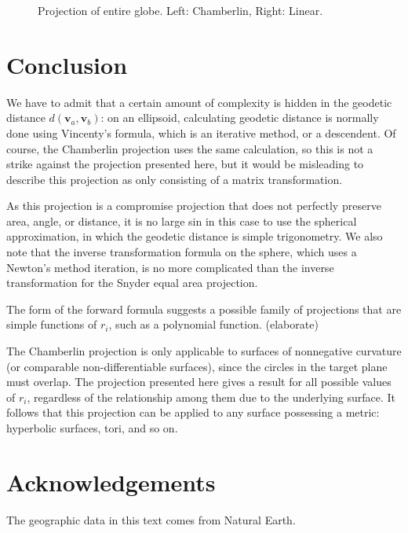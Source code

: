 \documentclass{amsart}[12pt]
\begin{document}
\begin{figure}%

\caption{Projection of entire globe. Left: Chamberlin, Right: Linear. }
\label{fig:globeproj}
\end{figure}

\section{Conclusion}
We have to admit that a certain amount of complexity is hidden in the geodetic
distance $d(\mathbf v_a, \mathbf v_b)$: on an ellipsoid, calculating geodetic
distance is normally done using Vincenty's formula, which is an iterative
method, or a descendent.\cite{proj} Of course, the Chamberlin projection
uses the same calculation, so this is not a strike against the projection
presented here, but it would be misleading to describe this projection as only
consisting of a matrix transformation.

As this projection is a compromise projection that does not perfectly
preserve area, angle, or distance, it is no large sin in this case to use the
spherical approximation, in which the geodetic distance is simple trigonometry.
We also note that the inverse transformation formula on the sphere, which
uses a Newton's method iteration, is no more complicated than the inverse
transformation for the Snyder equal area projection. \cite{snyder92}

The form of the forward formula suggests a possible family of projections that
are simple functions of $r_i$, such as a polynomial function. (elaborate)

The Chamberlin projection is only applicable to surfaces of nonnegative
curvature (or comparable non-differentiable surfaces), since the circles in the
target plane must overlap. The projection presented here gives a result for all
possible values of $r_i$, regardless of the relationship among them due to the
underlying surface. It follows that this projection can be applied to any
surface possessing a metric: hyperbolic surfaces, tori, and so on.

\section{Acknowledgements}
The geographic data in this text comes from Natural Earth.\cite{natearth}



\end{document}
